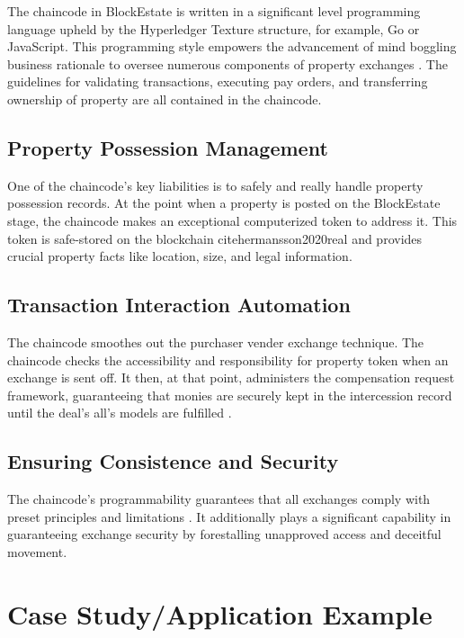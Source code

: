 \documentclass[3p,times]{elsarticle}
\begin{document}
The chaincode in BlockEstate is written in a significant level programming language upheld by the Hyperledger Texture structure, for example, Go or JavaScript. This programming style empowers the advancement of mind boggling business rationale to oversee numerous components of property exchanges \cite{veuger2020database}. The guidelines for validating transactions, executing pay orders, and transferring ownership of property are all contained in the chaincode.


\subsection{Property Possession Management}

One of the chaincode's key liabilities is to safely and really handle property possession records. At the point when a property is posted on the BlockEstate stage, the chaincode makes an exceptional computerized token to address it. This token is safe-stored on the blockchain citehermansson2020real and provides crucial property facts like location, size, and legal information.

\subsection{Transaction Interaction Automation}

The chaincode smoothes out the purchaser vender exchange technique. The chaincode checks the accessibility and responsibility for property token when an exchange is sent off. It then, at that point, administers the compensation request framework, guaranteeing that monies are securely kept in the intercession record until the deal's all's models are fulfilled \cite{saull2020can}.

\subsection{Ensuring Consistence and Security}

The chaincode's programmability guarantees that all exchanges comply with preset principles and limitations \cite{lindholm2021blockchain}. It additionally plays a significant capability in guaranteeing exchange security by forestalling unapproved access and deceitful movement.

\section{Case Study/Application Example}
\end{document}
